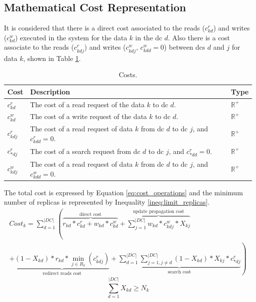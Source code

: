 \documentclass[english]{article}
\begin{document}
\subsection{Mathematical Cost Representation} \label{sec:math_cost_representation}
It is considered that there is a direct cost associated to the reads ($c^{r}_{kd}$) and writes ($c^{w}_{kd}$) executed in the system for the data $k$ in the \gls{dc} $d$. Also there is a cost associate to the reads ($c^{r}_{kdj}$) and writes ($c^{w}_{kdj}$, $c^{w}_{kdd} = 0$) between \glspl{dc} $d$ and $j$ for data $k$, shown in Table \ref{tb:costs}.
\begin{table}[ht!]
	\begin{center}
		\begin{tabular}{|l|p{9.2cm}|l|}
			\hline
			Cost & Description & Type \\
			\hline
			\hline
			$c^{r}_{kd}$   & The cost of a read request of the data $k$ to \gls{dc} $d$. & $\mathbb{R}^{+}$ \\
			\hline
			$c^{w}_{kd}$  & The cost of a write request of the data $k$ to \gls{dc} $d$. & $\mathbb{R}^{+}$ \\
			\hline
			$c^{r}_{kdj}$  & The cost of a read request of data $k$ from \gls{dc} $d$ to \gls{dc} $j$, and $c^{r}_{kdd} = 0$. & $\mathbb{R}^{+}$ \\
			\hline
			$c^{r}_{*dj}$  & The cost of a search request from \gls{dc} $d$ to \gls{dc} $j$, and $c^{r}_{*dd} = 0$. & $\mathbb{R}^{+}$ \\
			\hline
			$c^{w}_{kdj}$ & The cost of a read request of data $k$ from \gls{dc} $d$ to \gls{dc} $j$, and $c^{w}_{kdd} = 0$. & $\mathbb{R}^{+}$ \\
			\hline
		\end{tabular}
	\end{center}

	\caption{Costs.}
	\label{tb:costs}
\end{table}

The total cost is expressed by Equation \ref{eq:cost_operations} and the minimum number of replicas is represented by Inequality \ref{ineq:limit_replicas}.
\begin{equation} \label{eq:cost_operations}
	\begin{split}
		 Cost_{k} = \sum^{|DC|}_{d = 1} \left( \overbrace{r_{kd} * c^{r}_{kd} + w_{kd} * c^{w}_{kd}}^\text{direct cost} + \overbrace{\sum^{|DC|}_{j = 1} w_{kd} * c^{w}_{kdj} * X_{kj}}^\text{update propagation cost} \right. \\ 
		 \left. + \underbrace{(1 - X_{kd}) * r_{kd} * \min_{j \in R_{k}}(c^{r}_{kdj})}_\text{redirect reads cost} + \underbrace{\sum^{|DC|}_{d = 1}  \sum^{|DC|}_{j = 1, j \neq d}  (1 - X_{kd}) * X_{kj} * c^{r}_{*dj}}_\text{search cost}\right)
	 \end{split}
\end{equation}
\begin{equation} \label{ineq:limit_replicas}
	\sum^{|DC|}_{d = 1} X_{kd} \ge N_{k} 
\end{equation}
\end{document}
